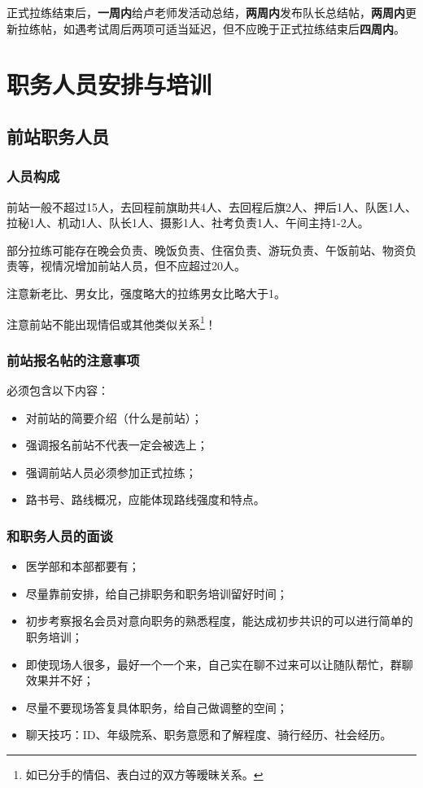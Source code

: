\documentclass[UTF8]{ctexart}
\begin{document}
正式拉练结束后，\textbf{一周内}给卢老师发活动总结，\textbf{两周内}发布队长总结帖，\textbf{两周内}更新拉练帖，如遇考试周后两项可适当延迟，但不应晚于正式拉练结束后\textbf{四周内}。

\section{职务人员安排与培训}

\subsection{前站职务人员}

\subsubsection{人员构成}

前站一般不超过15人，去回程前旗助共4人、去回程后旗2人、押后1人、队医1人、拉秘1人、机动1人、队长1人、摄影1人、社考负责1人、午间主持1-2人。

部分拉练可能存在晚会负责、晚饭负责、住宿负责、游玩负责、午饭前站、物资负责等，视情况增加前站人员，但不应超过20人。

注意新老比、男女比，强度略大的拉练男女比略大于1。

注意前站{\color{red}不能出现情侣或其他类似关系}\footnote{如已分手的情侣、表白过的双方等暧昧关系。}！

\subsubsection{前站报名帖的注意事项}

必须包含以下内容：
\begin{itemize}[nosep,left=4em]
    \item 对前站的简要介绍（什么是前站）；
    \item 强调报名前站不代表一定会被选上；
    \item 强调前站人员必须参加正式拉练；
    \item 路书号、路线概况，应能体现路线强度和特点。
\end{itemize}

\subsubsection{和职务人员的面谈}

\begin{itemize}[nosep,left=2em]
    \item 医学部和本部都要有；
    \item 尽量靠前安排，给自己排职务和职务培训留好时间；
    \item 初步考察报名会员对意向职务的熟悉程度，能达成初步共识的可以进行简单的职务培训；
    \item 即使现场人很多，最好一个一个来，自己实在聊不过来可以让随队帮忙，群聊效果并不好；
    \item 尽量不要现场答复具体职务，给自己做调整的空间；
    \item 聊天技巧：ID、年级院系、职务意愿和了解程度、骑行经历、社会经历。
\end{itemize}
\end{document}
